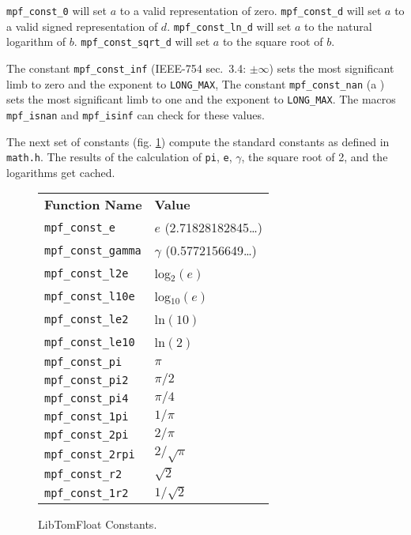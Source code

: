 \documentclass[a4paper]{book}
\theoremstyle{definition}
\theoremstyle{remark}
\begin{document}
{\texttt{mpf\_const\_0}} will set $a$ to a valid representation of zero.  {\texttt{mpf\_const\_d}} will set $a$ to a valid signed representation of $d$.  {\texttt{mpf\_const\_ln\_d}} will set $a$ to the natural logarithm of $b$.  {\texttt{mpf\_const\_sqrt\_d}} will set $a$ to the square root of $b$.

The constant {\texttt{mpf\_const\_inf}} (IEEE-754 sec.~3.4: $\pm \infty$) sets the most significant limb to zero and the exponent to {\texttt{LONG\_MAX}}, The constant {\texttt{mpf\_const\_nan}} (a ) sets the most significant limb to one and the exponent to {\texttt{LONG\_MAX}}. The macros {\texttt{mpf\_isnan}} and {\texttt{mpf\_isinf}} can check for these values.

The next set of constants (fig. \ref{fig:const}) compute the standard constants as defined in {\texttt{math.h}}. The results of the calculation of {\texttt{pi}}, {\texttt{e}}, {\texttt{$\gamma$}}, the square root of 2, and the logarithms get cached.
\begin{figure}[here]
\begin{center}
\begin{tabular}{|l|l|}
\hline \textbf{Function Name} & \textbf{Value} \\
{\texttt{mpf\_const\_e}} & $e$ (2.71828182845\ldots)\\
{\texttt{mpf\_const\_gamma}} & $\gamma$ (0.5772156649\ldots) \\
{\texttt{mpf\_const\_l2e}} & log$_2(e)$ \\
{\texttt{mpf\_const\_l10e}} & log$_{10}(e)$ \\
{\texttt{mpf\_const\_le2}}  & ln$(10)$ \\
{\texttt{mpf\_const\_le10}}  & ln$(2)$ \\
{\texttt{mpf\_const\_pi}}  & $\pi$ \\
{\texttt{mpf\_const\_pi2}}  & $\pi / 2$ \\
{\texttt{mpf\_const\_pi4}}  & $\pi / 4$ \\
{\texttt{mpf\_const\_1pi}}  & $1 / \pi$ \\
{\texttt{mpf\_const\_2pi}}  & $2 / \pi$ \\
{\texttt{mpf\_const\_2rpi}}  & $2 / \sqrt{\pi}$ \\
{\texttt{mpf\_const\_r2}}  & ${\sqrt{2}}$ \\
{\texttt{mpf\_const\_1r2}}  & $1 / {\sqrt{2}}$ \\
\hline
\end{tabular}
\end{center}
\caption{LibTomFloat Constants.}
\label{fig:const}
\end{figure}
\end{document}
